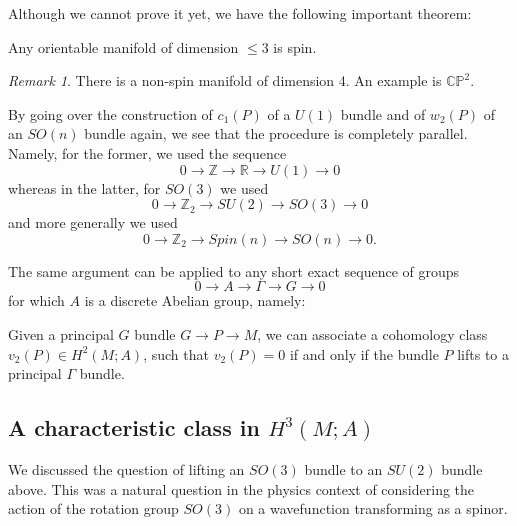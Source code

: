 \documentclass[12pt]{article}
\numberwithin{equation}{section}
\numberwithin{figure}{section}
\theoremstyle{remark}
\newtheorem{remark}[definition]{Remark}
\def\bR{\mathbb{R}}
\def\bZ{\mathbb{Z}}
\def\CP{\mathbb{CP}}
\begin{document}
Although we cannot prove it yet, we have the following important theorem:
\begin{theorem}
Any orientable manifold of dimension $\leq 3$ is spin.
\end{theorem}

\begin{remark}
There is a non-spin manifold of dimension 4. An example is $\CP^2$.
\end{remark}


By going over the construction of $c_1(P)$ of a $U(1)$ bundle and 
of $w_2(P)$ of an $SO(n)$ bundle again,
we see that the procedure is completely parallel.
Namely, for the former, we used the sequence \begin{equation}
0\to \bZ\to \bR \to U(1)\to 0 
\end{equation} whereas in the latter, for $SO(3)$ we used \begin{equation}
0\to \bZ_2\to SU(2)\to SO(3)\to 0
\end{equation} and more generally we used \begin{equation}
0\to \bZ_2\to Spin(n)\to SO(n)\to 0.
\end{equation}

The same argument can be applied to any short exact sequence of groups \begin{equation}
0\to A\to \Gamma \to G\to 0
\end{equation} for which $A$ is a discrete Abelian group,
namely:
\begin{proposition}
  Given a principal $G$ bundle $G\to P\to M$,
  we can associate a cohomology class $v_2(P)\in H^2(M;A)$,
  such that $v_2(P)=0$ if and only if the bundle $P$ lifts to a principal $\Gamma$ bundle.
\end{proposition}

\subsection{A characteristic class in $H^3(M;A)$}

We discussed the question of lifting an $SO(3)$ bundle to an $SU(2)$ bundle above.
This was a natural question in the physics context of considering 
the action of the rotation group $SO(3)$ on a wavefunction transforming as a spinor.
\end{document}

